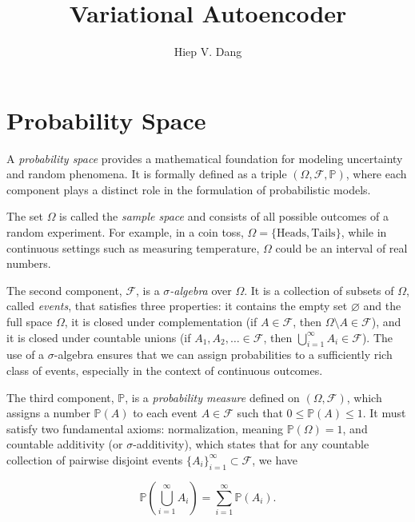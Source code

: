 \documentclass[10pt,twocolumn,article]{memoir}
\begin{document}
\title{Variational Autoencoder}
\author{Hiep V. Dang}
\date{}
\maketitle

\section{Probability Space}

A \textit{probability space} provides a mathematical foundation for modeling uncertainty and random phenomena. It is formally defined as a triple $(\Omega, \mathcal{F}, \mathbb{P})$, where each component plays a distinct role in the formulation of probabilistic models.

The set $\Omega$ is called the \textit{sample space} and consists of all possible outcomes of a random experiment. For example, in a coin toss, $\Omega = \{\text{Heads}, \text{Tails}\}$, while in continuous settings such as measuring temperature, $\Omega$ could be an interval of real numbers.

The second component, $\mathcal{F}$, is a \textit{$\sigma$-algebra} over $\Omega$. It is a collection of subsets of $\Omega$, called \textit{events}, that satisfies three properties: it contains the empty set $\varnothing$ and the full space $\Omega$, it is closed under complementation (if $A \in \mathcal{F}$, then $\Omega \setminus A \in \mathcal{F}$), and it is closed under countable unions (if $A_1, A_2, \dots \in \mathcal{F}$, then $\bigcup_{i=1}^{\infty} A_i \in \mathcal{F}$). The use of a $\sigma$-algebra ensures that we can assign probabilities to a sufficiently rich class of events, especially in the context of continuous outcomes.

The third component, $\mathbb{P}$, is a \textit{probability measure} defined on $(\Omega, \mathcal{F})$, which assigns a number $\mathbb{P}(A)$ to each event $A \in \mathcal{F}$ such that $0 \leq \mathbb{P}(A) \leq 1$. It must satisfy two fundamental axioms: normalization, meaning $\mathbb{P}(\Omega) = 1$, and countable additivity (or $\sigma$-additivity), which states that for any countable collection of pairwise disjoint events $\{A_i\}_{i=1}^{\infty} \subset \mathcal{F}$, we have

\begin{equation}
    \mathbb{P}\left( \bigcup_{i=1}^{\infty} A_i \right) = \sum_{i=1}^{\infty} \mathbb{P}(A_i).
\end{equation}
\end{document}
